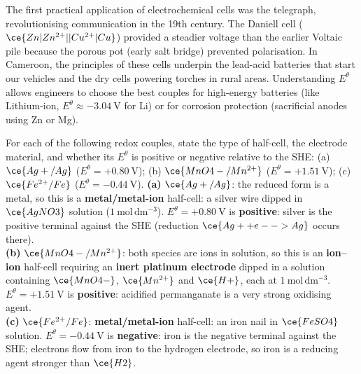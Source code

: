 \documentclass[11pt]{article}
\begin{document}
\begin{savaistu}
The first practical application of electrochemical cells was the telegraph, revolutionising communication in the 19th century. The Daniell cell ($\ce{Zn|Zn^{2+}||Cu^{2+}|Cu}$) provided a steadier voltage than the earlier Voltaic pile because the porous pot (early salt bridge) prevented polarisation. In Cameroon, the principles of these cells underpin the lead-acid batteries that start our vehicles and the dry cells powering torches in rural areas. Understanding $E^{\theta}$ allows engineers to choose the best couples for high-energy batteries (like Lithium-ion, $E^{\theta} \approx -3.04\ \mathrm{V}$ for Li) or for corrosion protection (sacrificial anodes using Zn or Mg).
\end{savaistu}

\begin{exoresolu}
For each of the following redox couples, state the type of half-cell, the electrode material, and whether its $E^{\theta}$ is positive or negative relative to the SHE: (a) $\ce{Ag+/Ag}$ ($E^{\theta} = +0.80\ \mathrm{V}$); (b) $\ce{MnO4-/Mn^{2+}}$ ($E^{\theta} = +1.51\ \mathrm{V}$); (c) $\ce{Fe^{2+}/Fe}$ ($E^{\theta} = -0.44\ \mathrm{V}$).
\tcblower
\textbf{(a)} $\ce{Ag+/Ag}$: the reduced form is a metal, so this is a \textbf{metal/metal-ion} half-cell: a silver wire dipped in $\ce{AgNO3}$ solution ($1\ \mathrm{mol\,dm^{-3}}$). $E^{\theta} = +0.80\ \mathrm{V}$ is \textbf{positive}: silver is the positive terminal against the SHE (reduction $\ce{Ag+ + e- -> Ag}$ occurs there).\\[2pt]
\textbf{(b)} $\ce{MnO4-/Mn^{2+}}$: both species are ions in solution, so this is an \textbf{ion--ion} half-cell requiring an \textbf{inert platinum electrode} dipped in a solution containing $\ce{MnO4-}$, $\ce{Mn^{2+}}$ and $\ce{H+}$, each at $1\ \mathrm{mol\,dm^{-3}}$. $E^{\theta} = +1.51\ \mathrm{V}$ is \textbf{positive}: acidified permanganate is a very strong oxidising agent.\\[2pt]
\textbf{(c)} $\ce{Fe^{2+}/Fe}$: \textbf{metal/metal-ion} half-cell: an iron nail in $\ce{FeSO4}$ solution. $E^{\theta} = -0.44\ \mathrm{V}$ is \textbf{negative}: iron is the negative terminal against the SHE; electrons flow from iron to the hydrogen electrode, so iron is a reducing agent stronger than $\ce{H2}$.
\end{exoresolu}
\end{document}
